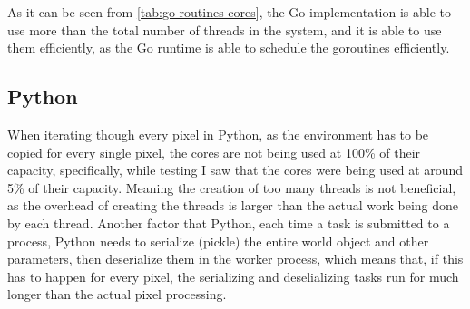 As it can be seen from \autoref{tab:go-routines-cores}, the Go implementation is able to use more than the total number of threads in the system, and it is able to use them efficiently, as the Go runtime is able to schedule the goroutines efficiently.

\subsection{Python}
When iterating though every pixel in Python, as the environment has to be copied for every single pixel, the cores are not being used at 100\% of their capacity, specifically, while testing I saw that the cores were being used at around 5\% of their capacity. Meaning the creation of too many threads is not beneficial, as the overhead of creating the threads is larger than the actual work being done by each thread. 
Another factor that Python, each time a task is submitted to a process, Python needs to serialize (pickle) the entire world object and other parameters, then deserialize them in the worker process, which means that, if this has to happen for every pixel, the serializing and deselializing tasks run for much longer than the actual pixel processing.


